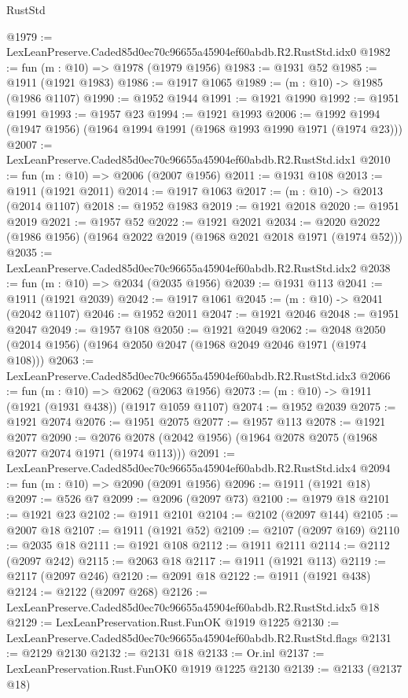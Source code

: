 \begin{lexlean}{RustStd}
\begin{coremodule}
@1979 := LexLeanPreserve.Caded85d0ec70c96655a45904ef60abdb.R2.RustStd.idx0
@1982 := fun (m : @10) => @1978 (@1979 @1956)
@1983 := @1931 @52
@1985 := @1911 (@1921 @1983)
@1986 := @1917 @1065
@1989 := (m : @10) -> @1985 (@1986 @1107)
@1990 := @1952 @1944
@1991 := @1921 @1990
@1992 := @1951 @1991
@1993 := @1957 @23
@1994 := @1921 @1993
@2006 := @1992 @1994 (@1947 @1956) (@1964 @1994 @1991 (@1968 @1993 @1990 @1971 (@1974 @23)))
@2007 := LexLeanPreserve.Caded85d0ec70c96655a45904ef60abdb.R2.RustStd.idx1
@2010 := fun (m : @10) => @2006 (@2007 @1956)
@2011 := @1931 @108
@2013 := @1911 (@1921 @2011)
@2014 := @1917 @1063
@2017 := (m : @10) -> @2013 (@2014 @1107)
@2018 := @1952 @1983
@2019 := @1921 @2018
@2020 := @1951 @2019
@2021 := @1957 @52
@2022 := @1921 @2021
@2034 := @2020 @2022 (@1986 @1956) (@1964 @2022 @2019 (@1968 @2021 @2018 @1971 (@1974 @52)))
@2035 := LexLeanPreserve.Caded85d0ec70c96655a45904ef60abdb.R2.RustStd.idx2
@2038 := fun (m : @10) => @2034 (@2035 @1956)
@2039 := @1931 @113
@2041 := @1911 (@1921 @2039)
@2042 := @1917 @1061
@2045 := (m : @10) -> @2041 (@2042 @1107)
@2046 := @1952 @2011
@2047 := @1921 @2046
@2048 := @1951 @2047
@2049 := @1957 @108
@2050 := @1921 @2049
@2062 := @2048 @2050 (@2014 @1956) (@1964 @2050 @2047 (@1968 @2049 @2046 @1971 (@1974 @108)))
@2063 := LexLeanPreserve.Caded85d0ec70c96655a45904ef60abdb.R2.RustStd.idx3
@2066 := fun (m : @10) => @2062 (@2063 @1956)
@2073 := (m : @10) -> @1911 (@1921 (@1931 @438)) (@1917 @1059 @1107)
@2074 := @1952 @2039
@2075 := @1921 @2074
@2076 := @1951 @2075
@2077 := @1957 @113
@2078 := @1921 @2077
@2090 := @2076 @2078 (@2042 @1956) (@1964 @2078 @2075 (@1968 @2077 @2074 @1971 (@1974 @113)))
@2091 := LexLeanPreserve.Caded85d0ec70c96655a45904ef60abdb.R2.RustStd.idx4
@2094 := fun (m : @10) => @2090 (@2091 @1956)
@2096 := @1911 (@1921 @18)
@2097 := @526 @7
@2099 := @2096 (@2097 @73)
@2100 := @1979 @18
@2101 := @1921 @23
@2102 := @1911 @2101
@2104 := @2102 (@2097 @144)
@2105 := @2007 @18
@2107 := @1911 (@1921 @52)
@2109 := @2107 (@2097 @169)
@2110 := @2035 @18
@2111 := @1921 @108
@2112 := @1911 @2111
@2114 := @2112 (@2097 @242)
@2115 := @2063 @18
@2117 := @1911 (@1921 @113)
@2119 := @2117 (@2097 @246)
@2120 := @2091 @18
@2122 := @1911 (@1921 @438)
@2124 := @2122 (@2097 @268)
@2126 := LexLeanPreserve.Caded85d0ec70c96655a45904ef60abdb.R2.RustStd.idx5 @18
@2129 := LexLeanPreservation.Rust.FunOK @1919 @1225
@2130 := LexLeanPreserve.Caded85d0ec70c96655a45904ef60abdb.R2.RustStd.flags
@2131 := @2129 @2130
@2132 := @2131 @18
@2133 := Or.inl
@2137 := LexLeanPreservation.Rust.FunOK0 @1919 @1225 @2130
@2139 := @2133 (@2137 @18)

\end{coremodule}
\end{lexlean}
